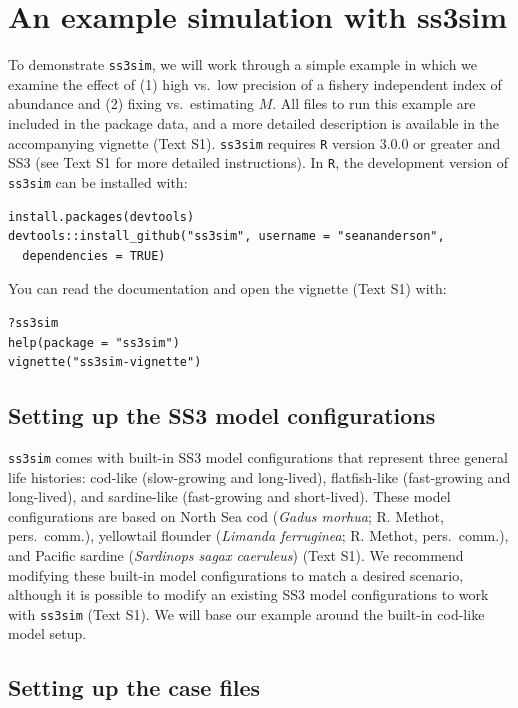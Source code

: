 \documentclass[12pt]{article}
\begin{document}
\section*{An example simulation with ss3sim}

To demonstrate \texttt{ss3sim}, we will work through a simple example in which we examine the effect of (1) high vs.~low precision of a fishery independent index of abundance and (2) fixing vs.~estimating $M$. All files to run this example are included in the package data, and a more detailed description is available in the accompanying vignette (Text S1). \texttt{ss3sim} requires \texttt{R} version 3.0.0 or greater and SS3 (see Text S1 for more detailed instructions). In \texttt{R}, the development version of \texttt{ss3sim} can be installed with:

\begin{verbatim}
install.packages(devtools)
devtools::install_github("ss3sim", username = "seananderson",
  dependencies = TRUE)
\end{verbatim}

\noindent
You can read the documentation and open the vignette (Text S1) with:

\begin{verbatim}
?ss3sim
help(package = "ss3sim")
vignette("ss3sim-vignette")
\end{verbatim}

\subsection*{Setting up the SS3 model configurations}

\texttt{ss3sim} comes with built-in SS3 model configurations that represent three general life histories: cod-like (slow-growing and long-lived), flatfish-like (fast-growing and long-lived), and sardine-like (fast-growing and short-lived). These model configurations are based on North Sea cod (\emph{Gadus morhua}; R. Methot, pers.~comm.), yellowtail flounder (\emph{Limanda ferruginea}; R. Methot, pers.~comm.), and Pacific sardine (\emph{Sardinops sagax caeruleus}) \cite{hill2012} (Text S1). We recommend modifying these built-in model configurations to match a desired scenario, although it is possible to modify an existing SS3 model configurations to work with \texttt{ss3sim} (Text S1). We will base our example around the built-in cod-like model setup.

\subsection*{Setting up the case files}
\end{document}
